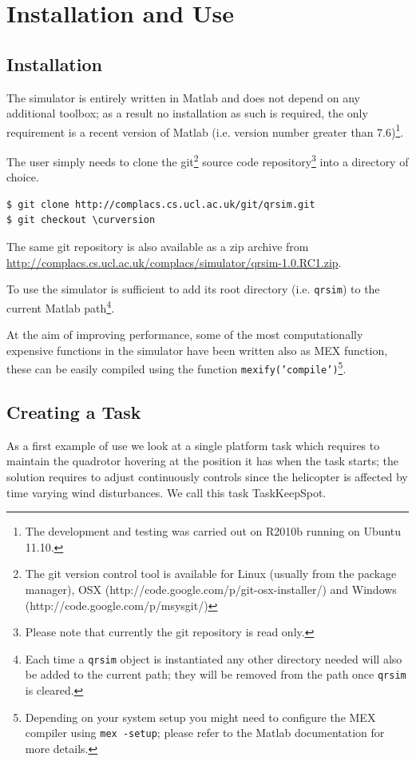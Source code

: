 \documentclass[a4paper,11pt]{report}
\newcommand{\curversion}{1.0.RC1}
\newcommand{\webrepo}{\url{http://complacs.cs.ucl.ac.uk/complacs/simulator/qrsim-\curversion.zip}\xspace}
\begin{document}
\chapter{Installation and Use}

\section{Installation}
The simulator is entirely written in Matlab and does not depend on any additional toolbox; as a result no installation as such is required, the only requirement is a recent version of Matlab (i.e. version number greater  than 7.6)\footnote{The development and testing was carried out on R2010b running on Ubuntu 11.10.}.

The user simply needs to clone the git\footnote{The git version control tool is available for Linux (usually from the package manager), OSX (http://code.google.com/p/git-osx-installer/) and Windows (http://code.google.com/p/msysgit/)} source code repository\footnote{Please note that currently the git repository is read only.} into a directory of choice.
\begin{verbatim}
$ git clone http://complacs.cs.ucl.ac.uk/git/qrsim.git
$ git checkout \curversion
\end{verbatim}

The same git repository is also available as a zip archive from \webrepo.

To use the simulator is sufficient to add its root directory (i.e. \texttt{qrsim}) to the current Matlab path\footnote{Each time a \texttt{qrsim} object is instantiated any other directory needed will also be added to the current path; they will be removed from the path once  \texttt{qrsim} is cleared.}.

At the aim of improving performance, some of the most computationally expensive functions in the simulator have been written also as MEX function, these can be easily compiled using the function \texttt{mexify('compile')}\footnote{Depending on your system setup you might need to configure the MEX compiler using \texttt{mex -setup}; please refer to the Matlab documentation for more details.}.

\section{Creating a Task}  \label{sec:createtask}

As a first example of use we look at a single platform task which requires to maintain the quadrotor hovering at the position it has when the task starts; the solution requires to adjust continuously controls since the helicopter is affected by time varying wind disturbances. We call this task TaskKeepSpot. 
 
\end{document}
